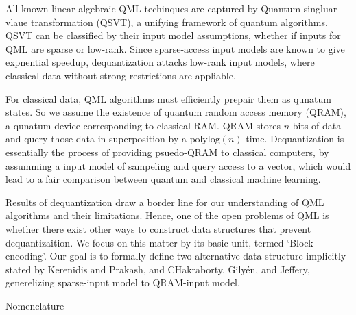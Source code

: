 \documentclass[10pt,twoside,reqno]{amsart} %
\makeatletter
\renewcommand{\section}{\@startsection{section}{1}
   \z@{.7\linespacing\@plus\linespacing}{.5\linespacing}
   {\normalfont\upshape\bfseries\centering}}
\theoremstyle{plain}
\theoremstyle{definition}
\makeatother
\begin{document}
All known linear algebraic QML techinques are captured by Quantum singluar 
vlaue transformation (QSVT), a unifying framework of quantum algorithms.
QSVT can be classified by their input model assumptions, whether if
inputs for QML are sparse or low-rank. Since sparse-access input models
are known to give expnential speedup, dequantization attacks low-rank
input models, where classical data without strong restrictions are appliable.

For classical data, QML algorithms must efficiently prepair them as qunatum
states. So we assume the existence of quantum random access memory (QRAM), 
a qunatum device corresponding to classical RAM. QRAM stores $n$ bits of data
and query those data in superposition by a $\textrm{polylog}(n)$ time. 
Dequantization is essentially the process of providing psuedo-QRAM to classical
computers, by assumming a input model of sampeling and query access to a vector,
which would lead to a fair comparison between quantum and classical machine
learning.

Results of dequantization draw a border line for our understanding of QML
algorithms and their limitations. Hence, one of the open problems of
QML is whether there exist other ways to construct data structures that
prevent dequantizaition. We focus on this matter by its basic unit, termed
`Block-encoding'. Our goal is to formally define two alternative data structure
implicitly stated by Kerenidis and Prakash, and CHakraborty, Gily\'en, and
Jeffery, generelizing sparse-input model to QRAM-input model.

\section{Nomenclature}
\end{document}
